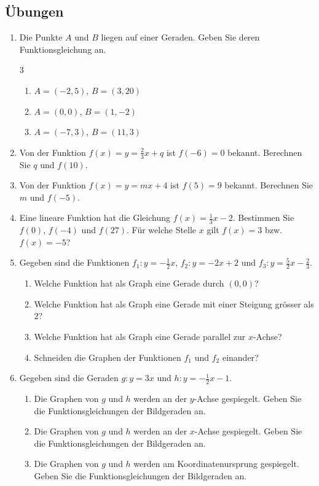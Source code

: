\subsection{Übungen}
\begin{enumerate}
    \item Die Punkte $A$ und $B$ liegen auf einer Geraden. Geben Sie deren Funktionsgleichung an.
          \begin{multicols}{3}
              \begin{enumerate}
                  \item $A = (-2,5)$, $B = (3,20)$
                  \item $A = (0,0)$, $B = (1,-2)$
                  \item $A = (-7,3)$, $B = (11,3)$
              \end{enumerate}
          \end{multicols}
    \item Von der Funktion $f(x) = y = \frac{2}{3}x + q$ ist $f(-6) = 0$ bekannt. Berechnen Sie $q$ und $f(10)$.
    \item Von der Funktion $f(x) = y = mx + 4$ ist $f(5) = 9$ bekannt. Berechnen Sie $m$ und $f(-5)$.
    \item Eine lineare Funktion hat die Gleichung $f(x) = \frac{1}{3}x - 2$. Bestimmen Sie $f(0)$, $f(-4)$ und $f(27)$. Für welche Stelle $x$ gilt $f(x) = 3$ bzw. $f(x) = -5$?
    \item Gegeben sind die Funktionen $f_{1}: y = -\frac{1}{2}x$, $f_{2}: y = -2x + 2$ und $f_{3}: y = \frac{5}{2}x - \frac{2}{3}$.
          \begin{enumerate}
              \item Welche Funktion hat als Graph eine Gerade durch $(0,0)$?
              \item Welche Funktion hat als Graph eine Gerade mit einer Steigung grösser als $2$?
              \item Welche Funktion hat als Graph eine Gerade parallel zur $x$-Achse?
              \item Schneiden die Graphen der Funktionen $f_{1}$ und $f_{2}$ einander?
          \end{enumerate}
    \item Gegeben sind die Geraden $g: y = 3x$ und $h: y = -\frac{1}{2}x - 1$.
          \begin{enumerate}
              \item Die Graphen von $g$ und $h$ werden an der $y$-Achse gespiegelt. Geben Sie die Funktionsgleichungen der Bildgeraden an.
              \item Die Graphen von $g$ und $h$ werden an der $x$-Achse gespiegelt. Geben Sie die Funktionsgleichungen der Bildgeraden an.
              \item Die Graphen von $g$ und $h$ werden am Koordinatenursprung gespiegelt. Geben Sie die Funktionsgleichungen der Bildgeraden an.
          \end{enumerate}
\end{enumerate}


